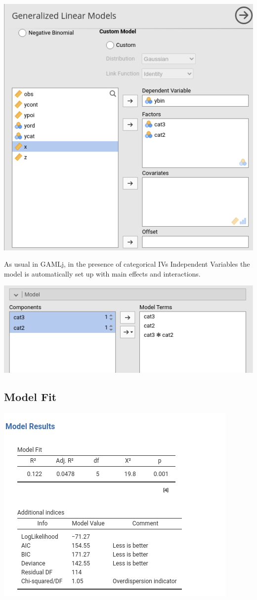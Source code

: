 \documentclass[
]{book}
\begin{document}
\includegraphics{bookletpics/3_logistic_input4.png}

As usual in {GAMLj}, in the presence of categorical {IVs {Independent Variables} } the model is automatically set up with main effects and interactions.

\includegraphics{bookletpics/3_logistic_input5.png}

\hypertarget{model-fit-1}{%
\subsection{Model Fit}\label{model-fit-1}}

\includegraphics{bookletpics/3_logistic_output7.png}
\end{document}
